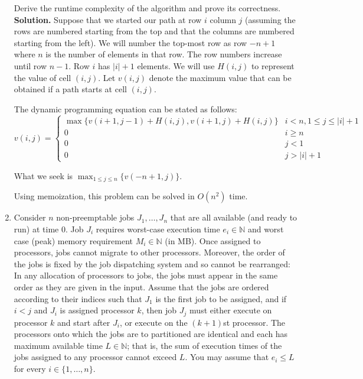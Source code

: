 \documentclass[11pt]{article}
\newcommand{\N}{\mathbb{N}}
\begin{document}
\begin{enumerate}
	Derive the runtime complexity of the algorithm and prove its correctness. \\

{\bf Solution.} Suppose that we started our path at row $i$ column $j$ (assuming the rows are numbered starting from the top and that the columns are numbered starting from the left). We will number the top-most row as row $-n+1$ where $n$ is the number of elements in that row. The row numbers increase until row $n-1$. Row $i$ has $|i|+1$ elements. We will use $H(i,j)$ to represent the value of cell $(i,j)$. Let $v(i,j)$ denote the maximum value that can be obtained if a path starts at cell $(i,j)$.

	The dynamic programming equation can be stated as follows:
	\[
		v(i,j) = \left \{ \begin{array}{ll}
								\max \{ v(i+1,j-1)+H(i,j), v(i+1,j)+H(i,j) \} & i < n, 1 \le j \le |i|+1 \\
								0 & i \ge n \\
								0 & j < 1 \\
								0 & j > |i|+1
							\end{array}
					\right.
	\]
	
	What we seek is $ \max_{1 \le j \le n} \{ v(-n+1,j) \}$.
	
	Using memoization, this problem can be solved in $O(n^{2})$ time.

\item Consider $n$ non-preemptable jobs $J_1, \dotsc, J_n$ that are all available (and ready to run) at time $0$. Job $J_i$ requires worst-case execution time $e_i \in \N$ and worst case (peak) memory requirement $M_i \in \N$ (in MB). Once assigned to processors, jobs cannot migrate to other processors. Moreover, the order of the jobs is fixed by the job dispatching system and so cannot be rearranged: In any allocation of processors to jobs, the jobs must appear in the same order as they are given in the input. Assume that the jobs are ordered according to their indices such that $J_{1}$ is the first job to be assigned, and if $i<j$ and $J_{i}$ is assigned processor $k$, then job $J_{j}$ must either execute on processor $k$ and start after $J_{i}$, or execute on the $(k+1)$st processor. The processors onto which the jobs are to partitioned are identical and 
each has maximum available time $L \in \N$; that is, the sum of execution times of the jobs assigned to any processor cannot exceed $L$. You may assume that $e_{i} \leq L$ for every $i \in \{1,\dotsc, n\}$.


\end{enumerate}
\end{document}
